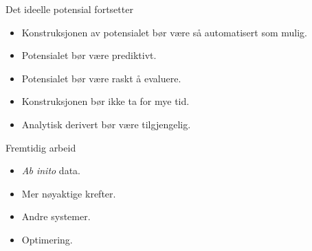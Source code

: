 \documentclass{beamer}
\begin{document}
\begin{frame}

\begin{block}{Det ideelle potensial fortsetter}
 \begin{itemize}
  \item Konstruksjonen av potensialet bør være så automatisert som mulig.
  \item Potensialet bør være prediktivt. 
  \item Potensialet bør være raskt å evaluere.
  \item Konstruksjonen bør ikke ta for mye tid. 
  \item Analytisk derivert bør være tilgjengelig. 
 \end{itemize}
\end{block}

\end{frame}


\begin{frame}

\begin{block}{Fremtidig arbeid}
 \begin{itemize}
  \item \textit{Ab inito} data. 
  \item Mer nøyaktige krefter. 
  \item Andre systemer. 
  \item Optimering. 
 \end{itemize}
\end{block}

\end{frame}
\end{document}
